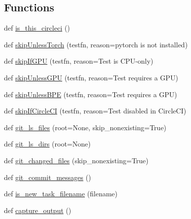 \subsection*{Functions}
\begin{DoxyCompactItemize}
\item 
def \hyperlink{namespaceparlai_1_1utils_1_1testing_a2b1aba8cb2afc498691840f4b8999420}{is\+\_\+this\+\_\+circleci} ()
\item 
def \hyperlink{namespaceparlai_1_1utils_1_1testing_a7b182622aebc6cdc41ee3b99ebe47432}{skip\+Unless\+Torch} (testfn, reason=\textquotesingle{}pytorch is not installed\textquotesingle{})
\item 
def \hyperlink{namespaceparlai_1_1utils_1_1testing_a2d3bb5013e210bf866032aedc812859b}{skip\+If\+G\+PU} (testfn, reason=\textquotesingle{}Test is C\+PU-\/only\textquotesingle{})
\item 
def \hyperlink{namespaceparlai_1_1utils_1_1testing_a2773d8b6d4631fa1f639dde415eb3e2b}{skip\+Unless\+G\+PU} (testfn, reason=\textquotesingle{}Test requires a G\+PU\textquotesingle{})
\item 
def \hyperlink{namespaceparlai_1_1utils_1_1testing_ab04af7a525a569f29b936b54b32899b7}{skip\+Unless\+B\+PE} (testfn, reason=\textquotesingle{}Test requires a G\+PU\textquotesingle{})
\item 
def \hyperlink{namespaceparlai_1_1utils_1_1testing_a056ab7a9ad687500924a29001a7d9264}{skip\+If\+Circle\+CI} (testfn, reason=\textquotesingle{}Test disabled in Circle\+CI\textquotesingle{})
\item 
def \hyperlink{namespaceparlai_1_1utils_1_1testing_a50b91b6f209eeedd93ae7ec0e790b121}{git\+\_\+ls\+\_\+files} (root=None, skip\+\_\+nonexisting=True)
\item 
def \hyperlink{namespaceparlai_1_1utils_1_1testing_a767a8ac6ea27697e6f782d7375d94933}{git\+\_\+ls\+\_\+dirs} (root=None)
\item 
def \hyperlink{namespaceparlai_1_1utils_1_1testing_a2e61f8f35b8ccf518e3561a224781ced}{git\+\_\+changed\+\_\+files} (skip\+\_\+nonexisting=True)
\item 
def \hyperlink{namespaceparlai_1_1utils_1_1testing_aa9971204bea89f174596698b2e736214}{git\+\_\+commit\+\_\+messages} ()
\item 
def \hyperlink{namespaceparlai_1_1utils_1_1testing_a18092382f94848a52ef19248aa39f7ca}{is\+\_\+new\+\_\+task\+\_\+filename} (filename)
\item 
def \hyperlink{namespaceparlai_1_1utils_1_1testing_ab00d4d693202afab92c06387aa50699b}{capture\+\_\+output} ()

\end{DoxyCompactItemize}
